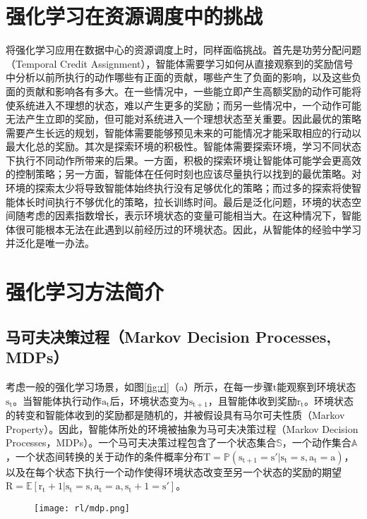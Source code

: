 \section{强化学习在资源调度中的挑战}
将强化学习应用在数据中心的资源调度上时，同样面临挑战。首先是功劳分配问题（Temporal Credit Assignment），智能体需要学习如何从直接观察到的奖励信号中分析以前所执行的动作哪些有正面的贡献，哪些产生了负面的影响，以及这些负面的贡献和影响各有多大。在一些情况中，一些能立即产生高额奖励的动作可能将使系统进入不理想的状态，难以产生更多的奖励；而另一些情况中，一个动作可能无法产生立即的奖励，但可能对系统进入一个理想状态至关重要。因此最优的策略需要产生长远的规划，智能体需要能够预见未来的可能情况才能采取相应的行动以最大化总的奖励。其次是探索环境的积极性。智能体需要探索环境，学习不同状态下执行不同动作所带来的后果。一方面，积极的探索环境让智能体可能学会更高效的控制策略；另一方面，智能体在任何时刻也应该尽量执行以找到的最优策略。对环境的探索太少将导致智能体始终执行没有足够优化的策略；而过多的探索将使智能体长时间执行不够优化的策略，拉长训练时间。最后是泛化问题，环境的状态空间随考虑的因素指数增长，表示环境状态的变量可能相当大。在这种情况下，智能体很可能根本无法在此遇到以前经历过的环境状态。因此，从智能体的经验中学习并泛化是唯一办法。

\section{强化学习方法简介}
\subsection{马可夫决策过程（Markov Decision Processes, MDPs）}
考虑一般的强化学习场景，如图\ref{fig:rl}（a）所示，在每一步骤$\mathrm{t}$能观察到环境状态$\mathrm{s_t}$。当智能体执行动作$\mathrm{a_t}$后，环境状态变为$\mathrm{s_{t+1}}$，且智能体收到奖励$\mathrm{r_t}$。环境状态的转变和智能体收到的奖励都是随机的，并被假设具有马尔可夫性质（Markov Property）。因此，智能体所处的环境被抽象为马可夫决策过程（Markov Decision Processes，MDPs）。一个马可夫决策过程包含了一个状态集合$\mathbb{S}$，一个动作集合$\mathbb{A}$，一个状态间转换的关于动作的条件概率分布$\mathrm{T=\mathbb{P}(s_{t+1}=s'|s_t=s, a_t = a)}$，以及在每个状态下执行一个动作使得环境状态改变至另一个状态的奖励的期望$\mathrm{R=\mathbb{E}[r_t+1|s_t=s, a_t=a, s_t+1=s']}$。

\begin{figure}
  \centering
  \begin{minipage}[b]{0.7\textwidth}
    \centering
    \texttt{[image: rl/mdp.png]}
    \label{fig:mdp}
  \end{minipage}     
\end{figure}

